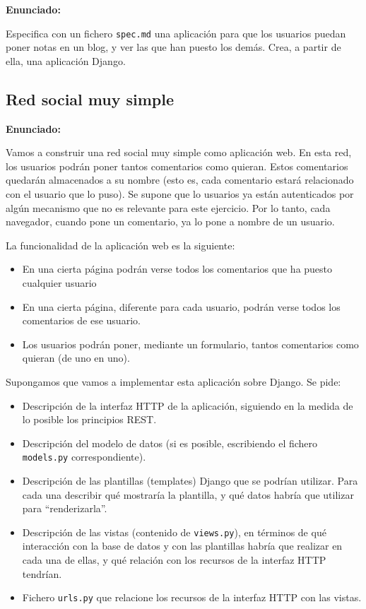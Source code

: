 \textbf{Enunciado:}

Especifica con un fichero \texttt{spec.md} una aplicación para que los usuarios puedan poner notas en un blog, y ver las que han puesto los demás. Crea, a partir de ella, una aplicación Django.



\subsection{Red social muy simple}
\label{subsec:mvc-red-social}

\textbf{Enunciado:}

Vamos a construir una red social muy simple como aplicación web. En esta red, los usuarios podrán poner tantos comentarios como quieran. Estos comentarios quedarán almacenados a su nombre (esto es, cada comentario estará relacionado con el usuario que lo puso). Se supone que lo usuarios ya están autenticados por algún mecanismo que no es relevante para este ejercicio. Por lo tanto, cada navegador, cuando pone un comentario, ya lo pone a nombre de un usuario.

La funcionalidad de la aplicación web es la siguiente:

\begin{itemize}
\item En una cierta página podrán verse todos los comentarios que ha puesto cualquier usuario
\item En una cierta página, diferente para cada usuario, podrán verse todos los comentarios de ese usuario.
\item Los usuarios podrán poner, mediante un formulario, tantos comentarios como quieran (de uno en uno).
\end{itemize}

Supongamos que vamos a implementar esta aplicación sobre Django. Se pide:

\begin{itemize}
\item Descripción de la interfaz HTTP de la aplicación, siguiendo en la medida de lo posible los principios REST.
\item Descripción del modelo de datos (si es posible, escribiendo el fichero \texttt{models.py} correspondiente).
\item Descripción de las plantillas (templates) Django que se podrían utilizar. Para cada una describir qué mostraría la plantilla, y qué datos habría que utilizar para ``renderizarla''.
\item Descripción de las vistas (contenido de \texttt{views.py}), en términos de qué interacción con la base de datos y con las plantillas habría que realizar en cada una de ellas, y qué relación con los recursos de la interfaz HTTP tendrían.
\item Fichero \texttt{urls.py} que relacione los recursos de la interfaz HTTP con las vistas.
\end{itemize}

